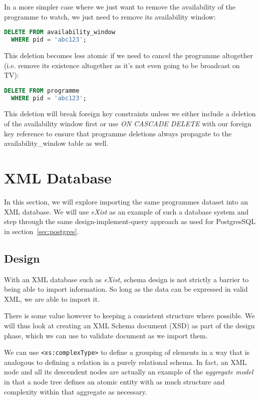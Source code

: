 \documentclass[11pt,a4paper]{article}
\begin{document}
In a more simpler case where we just want to remove the availability of
the programme to watch, we just need to remove its availability window:

\begin{lstlisting}[language=SQL]
  DELETE FROM availability_window
  WHERE pid = 'abc123';
\end{lstlisting}

This deletion becomes less atomic if we need to cancel the programme
altogether (i.e. remove its existence altogether as it's not
even going to be broadcast on TV):

\begin{lstlisting}[language=SQL]
  DELETE FROM programme
  WHERE pid = 'abc123';
\end{lstlisting}

This deletion will break foreign key constraints unless we either
include a deletion of the availability window first or use
\emph{ON CASCADE DELETE} with our foreign key reference to ensure
that programme deletions always propagate to the
availability\_window table as well.

\section{XML Database}

In this section, we will explore importing the same programmes dataset
into an XML database. We will use \emph{eXist} as an example of such
a database system and step through the same design-implement-query
approach as used for PostgresSQL in section~\ref{sec:postgres}.

\subsection{Design}

With an XML database such as \emph{eXist}, schema design is not strictly
a barrier to being able to import information. So long as the data can
be expressed in valid XML, we are able to import it.

There is some value however to keeping a consistent structure where possible.
We will thus look at creating
an XML Schema document (XSD) as part of the design phase, which we can
use to validate document as we import them.

We can use \lstinline|<xs:complexType>| to define a grouping of elements
in a way that is analogous to defining a relation in a purely relational
schema. In fact, an XML node and all its descendent nodes are actually an
example of the \emph{aggregate model} in that a node tree defines an
atomic entity with as much structure and complexity within that
aggregate as necessary.
\end{document}
